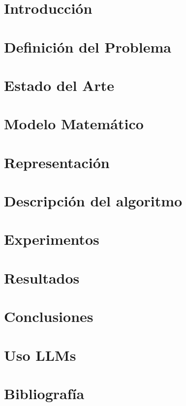 \documentclass[letter, 10pt]{article}
\begin{document}
\section{Introducci\'on}


\section{Definici\'on del Problema}


\section{Estado del Arte}


\section{Modelo Matem\'atico}


\section{Representación}


\section{Descripción del algoritmo}


\section{Experimentos}


\section{Resultados}


\section{Conclusiones}


\pagebreak
\section{Uso LLMs}


\pagebreak
\section{Bibliograf\'ia}


\end{document}
